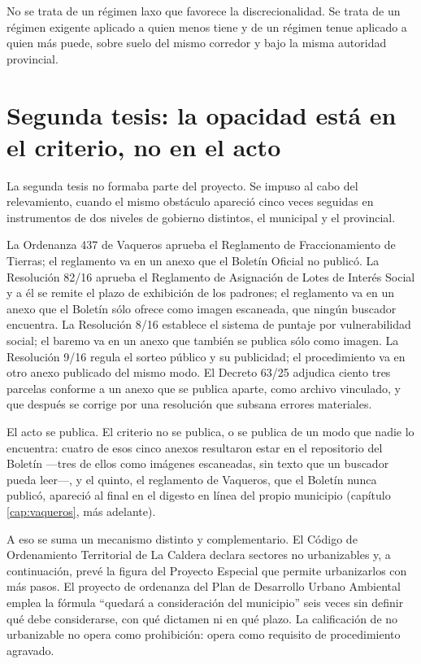 No se trata de un régimen laxo que favorece la discrecionalidad. Se trata de un régimen exigente aplicado a quien menos tiene y de un régimen tenue aplicado a quien más puede, sobre suelo del mismo corredor y bajo la misma autoridad provincial.

\section{Segunda tesis: la opacidad está en el criterio, no en el acto}

La segunda tesis no formaba parte del proyecto. Se impuso al cabo del relevamiento, cuando el mismo obstáculo apareció cinco veces seguidas en instrumentos de dos niveles de gobierno distintos, el municipal y el provincial.

La Ordenanza 437 de Vaqueros aprueba el Reglamento de Fraccionamiento de Tierras; el reglamento va en un anexo que el Boletín Oficial no publicó. La Resolución 82/16 aprueba el Reglamento de Asignación de Lotes de Interés Social y a él se remite el plazo de exhibición de los padrones; el reglamento va en un anexo que el Boletín sólo ofrece como imagen escaneada, que ningún buscador encuentra. La Resolución 8/16 establece el sistema de puntaje por vulnerabilidad social; el baremo va en un anexo que también se publica sólo como imagen. La Resolución 9/16 regula el sorteo público y su publicidad; el procedimiento va en otro anexo publicado del mismo modo. El Decreto 63/25 adjudica ciento tres parcelas conforme a un anexo que se publica aparte, como archivo vinculado, y que después se corrige por una resolución que subsana errores materiales.

El acto se publica. El criterio no se publica, o se publica de un modo que nadie lo encuentra: cuatro de esos cinco anexos resultaron estar en el repositorio del Boletín ---tres de ellos como imágenes escaneadas, sin texto que un buscador pueda leer---, y el quinto, el reglamento de Vaqueros, que el Boletín nunca publicó, apareció al final en el digesto en línea del propio municipio (capítulo \ref{cap:vaqueros}, más adelante).

A eso se suma un mecanismo distinto y complementario. El Código de Ordenamiento Territorial de La Caldera declara sectores no urbanizables y, a continuación, prevé la figura del Proyecto Especial que permite urbanizarlos con más pasos. El proyecto de ordenanza del Plan de Desarrollo Urbano Ambiental emplea la fórmula ``quedará a consideración del municipio'' seis veces sin definir qué debe considerarse, con qué dictamen ni en qué plazo. La calificación de no urbanizable no opera como prohibición: opera como requisito de procedimiento agravado.


